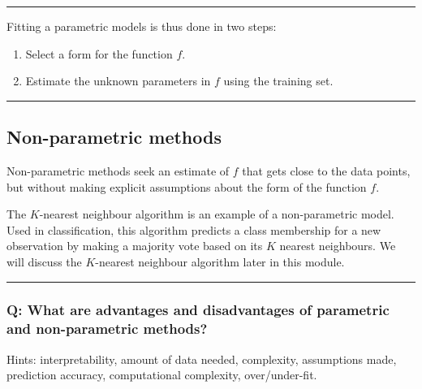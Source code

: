\documentclass[]{article}
\providecommand{\tightlist}{%
  \setlength{\itemsep}{0pt}\setlength{\parskip}{0pt}}
\begin{document}
\begin{center}\rule{0.5\linewidth}{\linethickness}\end{center}

Fitting a parametric models is thus done in two steps:

\begin{enumerate}
\def\labelenumi{\arabic{enumi}.}
\tightlist
\item
  Select a form for the function \(f\).\\
\item
  Estimate the unknown parameters in \(f\) using the training set.
\end{enumerate}

\begin{center}\rule{0.5\linewidth}{\linethickness}\end{center}

\hypertarget{non-parametric-methods}{%
\subsection{Non-parametric methods}\label{non-parametric-methods}}

Non-parametric methods seek an estimate of \(f\) that gets close to the
data points, but without making explicit assumptions about the form of
the function \(f\).

The \(K\)-nearest neighbour algorithm is an example of a non-parametric
model. Used in classification, this algorithm predicts a class
membership for a new observation by making a majority vote based on its
\(K\) nearest neighbours. We will discuss the \(K\)-nearest neighbour
algorithm later in this module.

\begin{center}\rule{0.5\linewidth}{\linethickness}\end{center}

\hypertarget{q-what-are-advantages-and-disadvantages-of-parametric-and-non-parametric-methods}{%
\subsubsection{Q: What are advantages and disadvantages of parametric
and non-parametric
methods?}\label{q-what-are-advantages-and-disadvantages-of-parametric-and-non-parametric-methods}}

Hints: interpretability, amount of data needed, complexity, assumptions
made, prediction accuracy, computational complexity, over/under-fit.
\end{document}
